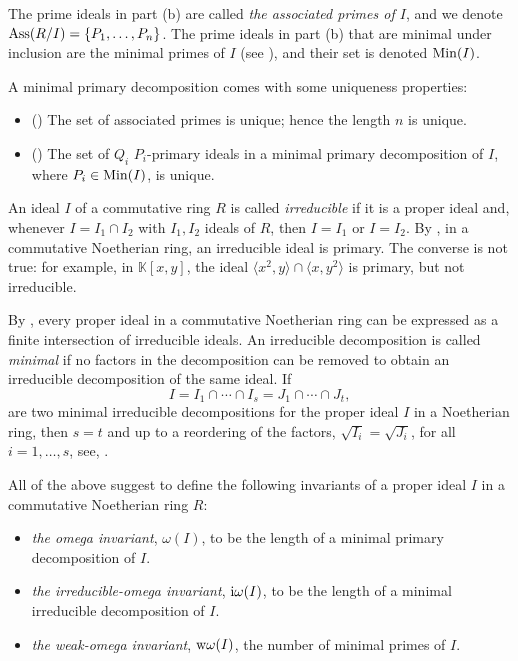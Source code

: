 \documentclass[11pt]{amsart}   %
\begin{document}
The prime ideals in part (b) are called {\em the associated primes of $I$}, and we denote ${\rm Ass}(R/I)=\{P_1,\ldots,P_n\}$. The prime ideals in part (b) that are minimal under inclusion are the minimal primes of $I$ (see \cite[Proposition 4.24]{Sh}), and their set is denoted ${\rm Min}(I)$.

A minimal primary decomposition comes with some uniqueness properties:

\begin{itemize}
  \item[(i)] (\cite[Corollary 4.18]{Sh}) The set of associated primes is unique; hence the length $n$ is unique.
  \item[(ii)] (\cite[Theorem 4.29]{Sh}) The set of $Q_i$ $P_i$-primary ideals in a minimal primary decomposition of $I$, where $P_i\in{\rm Min}(I)$, is unique.
\end{itemize}

\medskip

An ideal $I$ of a commutative ring $R$ is called {\em irreducible} if it is a proper ideal and, whenever $I=I_1\cap I_2$ with $I_1, I_2$ ideals of $R$, then $I=I_1$ or $I=I_2$. By \cite[Proposition 4.34]{Sh}, in a commutative Noetherian ring, an irreducible ideal is primary. The converse is not true: for example, in $\mathbb K[x,y]$, the ideal $\langle x^2,y\rangle\cap \langle x,y^2\rangle$ is primary, but not irreducible.

By \cite[Proposition 4.33]{Sh}, every proper ideal in a commutative Noetherian ring can be expressed as a finite intersection of irreducible ideals. An irreducible decomposition is called {\em minimal} if no factors in the decomposition can be removed to obtain an irreducible decomposition of the same ideal. If $$I=I_1\cap\cdots\cap I_s=J_1\cap\cdots \cap J_t,$$ are two minimal irreducible decompositions for the proper ideal $I$ in a Noetherian ring, then $s=t$ and up to a reordering of the factors, $\sqrt{I_i}=\sqrt{J_i}$, for all $i=1,\ldots,s$, see, \cite[Exercise 7.19]{AtMa}.

\medskip

All of the above suggest to define the following invariants of a proper ideal $I$ in a commutative Noetherian ring $R$:

\begin{itemize}
  \item {\em the omega invariant}, $\omega(I)$, to be the length of a minimal primary decomposition of $I$.
  \item {\em the irreducible-omega invariant}, ${\rm i}\omega(I)$, to be the length of a minimal irreducible decomposition of $I$.
  \item {\em the weak-omega invariant}, ${\rm w}\omega(I)$, the number of minimal primes of $I$.
\end{itemize}
\end{document}
